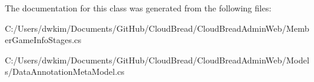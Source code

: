 The documentation for this class was generated from the following files\+:\begin{DoxyCompactItemize}
\item 
C\+:/\+Users/dwkim/\+Documents/\+Git\+Hub/\+Cloud\+Bread/\+Cloud\+Bread\+Admin\+Web/Member\+Game\+Info\+Stages.\+cs\item 
C\+:/\+Users/dwkim/\+Documents/\+Git\+Hub/\+Cloud\+Bread/\+Cloud\+Bread\+Admin\+Web/\+Models/Data\+Annotation\+Meta\+Model.\+cs\end{DoxyCompactItemize}
